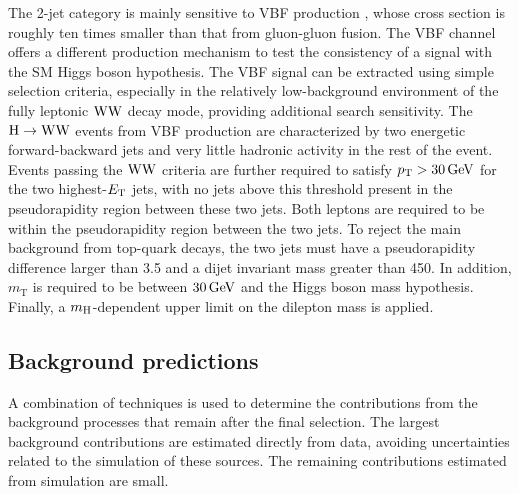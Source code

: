 \documentclass[11pt,twoside,a4paper,cmspaper,final,collab]{cms-tdr}
\begin{document}
The 2-jet category is mainly sensitive to VBF production
\cite{Ciccolini:2007jr, Ciccolini:2007ec, Arnold:2008rz,Cahn:1987}, whose
cross section is roughly ten times smaller than that from
gluon-gluon fusion. The VBF channel offers a different production mechanism
to test the consistency of a signal with the SM Higgs boson hypothesis.
The VBF signal can be extracted
using simple selection criteria, especially in the relatively low-background environment
of the fully leptonic $\mathrm{W}\mathrm{W}$ decay mode, providing additional search sensitivity.
The $\mathrm{H} \to \mathrm{W}\mathrm{W}$ events from VBF production are characterized by two
energetic forward-backward jets and very little hadronic activity in
the rest of the event.
Events passing the $\mathrm{W}\mathrm{W}$ criteria are further required to satisfy $p_{\mathrm{T}}>30\,\text{Ge\hspace{-.08em}V}$
for the two highest-$E_{\mathrm{T}}$ jets, with no jets above this threshold
present in the pseudorapidity region between these two jets. Both leptons
are required to be within the pseudorapidity region between the two jets.
To reject the main background from top-quark decays,  the two jets
must have a pseudorapidity difference larger than 3.5 and a dijet
invariant mass greater than 450\GeV.
In addition, $m_\mathrm{T}$ is required to be between $30\,\text{Ge\hspace{-.08em}V}$ and
the Higgs boson mass hypothesis. Finally, a $m_{\mathrm{H}}$-dependent upper limit on
the dilepton mass is applied. %

\subsection{Background predictions}
\label{sec:backgrounds}

A combination of techniques is used to determine the contributions from the background
processes that remain after the final selection.
The largest background contributions are estimated directly from data,
avoiding uncertainties related to
the simulation of these sources. The remaining contributions
estimated from simulation are small.
\end{document}
